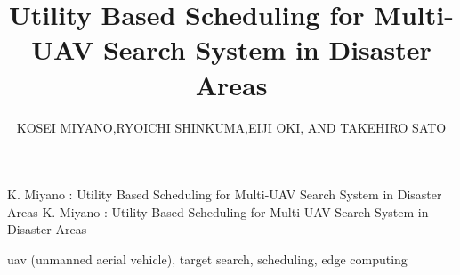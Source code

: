 \documentclass{ieeeaccess}
\begin{document}
\title{Utility Based Scheduling for Multi-UAV Search System in Disaster Areas}
%
%
%

\author{\uppercase{Kosei MIYANO,Ryoichi SHINKUMA,Eiji OKI, and Takehiro SATO}}
\address{Graduate School of Informatics, Kyoto University Yoshidahon-machi, Sakyo-ku, Kyoto 606-8501 Japan}

\markboth
{K. Miyano \headeretal: Utility Based Scheduling for Multi-UAV Search System in Disaster Areas}
{K. Miyano \headeretal: Utility Based Scheduling for Multi-UAV Search System in Disaster Areas}


\begin{IEEEkeywords}
uav (unmanned aerial vehicle), target search, scheduling, edge computing
\end{IEEEkeywords}
\end{document}
